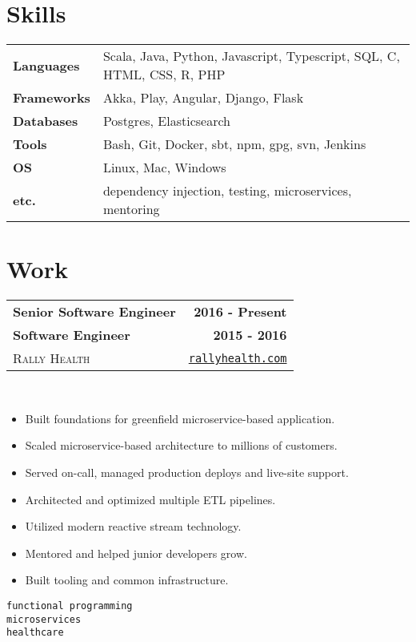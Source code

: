 \documentclass[10pt,letterpaper]{article}
\newenvironment{details}
{\begin{itemize}}
{\end{itemize}}
\begin{document}
  \setcounter{secnumdepth}{0}

  \section{Skills}

  \noindent
  \begin{tabularx}{\textwidth}{@{}lX@{}}
    \textbf{Languages} & Scala, Java, Python, Javascript, Typescript, SQL, C, HTML, CSS, R, PHP \\
    \textbf{Frameworks} & Akka, Play, Angular, Django, Flask \\
    \textbf{Databases} & Postgres, Elasticsearch \\
    \textbf{Tools} & Bash, Git, Docker, sbt, npm, gpg, svn, Jenkins \\
    \textbf{OS} & Linux, Mac, Windows \\
    \textbf{etc.} & dependency injection, testing, microservices, mentoring
  \end{tabularx}

  \section{Work}

  \noindent\begin{tabularx}{\textwidth}{@{}X r@{}}
    \textbf{Senior Software Engineer} & \textbf{2016 - Present} \\
    \textbf{Software Engineer} & \textbf{2015 - 2016} \\
    \textsc{Rally Health} & \texttt{\href{http://rallyhealth.com}{rallyhealth.com}}
  \end{tabularx}
  \hfill\\
  \noindent\begin{minipage}[t]{\dimexpr.7\textwidth-.7\columnsep}
    \raggedright
    \begin{details}
    \item Built foundations for greenfield microservice-based application.
    \item Scaled microservice-based architecture to millions of customers.
    \item Served on-call, managed production deploys and live-site support.
    \item Architected and optimized multiple ETL pipelines.
    \item Utilized modern reactive stream technology.
    \item Mentored and helped junior developers grow.
    \item Built tooling and common infrastructure.
    \end{details}
  \end{minipage}%
  \begin{minipage}[t]{\dimexpr.32\textwidth-.32\columnsep}
    \raggedleft
    \texttt{functional programming} \\
    \texttt{microservices} \\
    \texttt{healthcare}
  \end{minipage}
\end{document}
